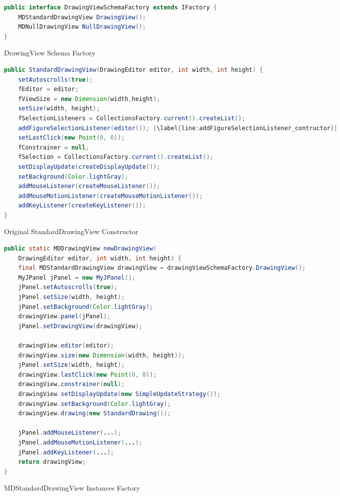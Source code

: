 \begin{sourcecode}[H]
	\begin{lstlisting}[language=Java, escapechar=|]
public interface DrawingViewSchemaFactory extends IFactory {
	MDStandardDrawingView DrawingView();
	MDNullDrawingView NullDrawingView();
}
	\end{lstlisting}
	\caption{DrawingView Schema Factory}
	\label{lst:DrawingViewSchemaFactory}
\end{sourcecode}

\begin{sourcecode}[H]
	\begin{lstlisting}[language=Java, escapechar=|]
public StandardDrawingView(DrawingEditor editor, int width, int height) {
	setAutoscrolls(true);
	fEditor = editor;
	fViewSize = new Dimension(width,height);
	setSize(width, height);
	fSelectionListeners = CollectionsFactory.current().createList();
	addFigureSelectionListener(editor()); |\label{line:addFigureSelectionListener_contructor}|
	setLastClick(new Point(0, 0));
	fConstrainer = null;
	fSelection = CollectionsFactory.current().createList();
	setDisplayUpdate(createDisplayUpdate());
	setBackground(Color.lightGray);
	addMouseListener(createMouseListener());
	addMouseMotionListener(createMouseMotionListener());
	addKeyListener(createKeyListener());
}
	\end{lstlisting}
	\label{lst:DrawingView Constructor}
	\caption{Original StandardDrawingView Constructor}
\end{sourcecode}

\begin{sourcecode}[H]
	\begin{lstlisting}[language=Java, escapechar=|]
public static MDDrawingView newDrawingView(
	DrawingEditor editor, int width, int height) {
	final MDStandardDrawingView drawingView = drawingViewSchemaFactory.DrawingView();
	MyJPanel jPanel = new MyJPanel();
	jPanel.setAutoscrolls(true);
 	jPanel.setSize(width, height);
	jPanel.setBackground(Color.lightGray);
	drawingView.panel(jPanel);
	jPanel.setDrawingView(drawingView);

	drawingView.editor(editor);
	drawingView.size(new Dimension(width, height));
	jPanel.setSize(width, height);
	drawingView.lastClick(new Point(0, 0));
	drawingView.constrainer(null);
	drawingView.setDisplayUpdate(new SimpleUpdateStrategy());
	drawingView.setBackground(Color.lightGray);
	drawingView.drawing(new StandardDrawing());

	jPanel.addMouseListener(...);
	jPanel.addMouseMotionListener(...);
	jPanel.addKeyListener(...);
	return drawingView;
}
	\end{lstlisting}
	\label{lst:MDStandardDrawingView Instances Factory}
	\caption{MDStandardDrawingView Instances Factory}
\end{sourcecode}

